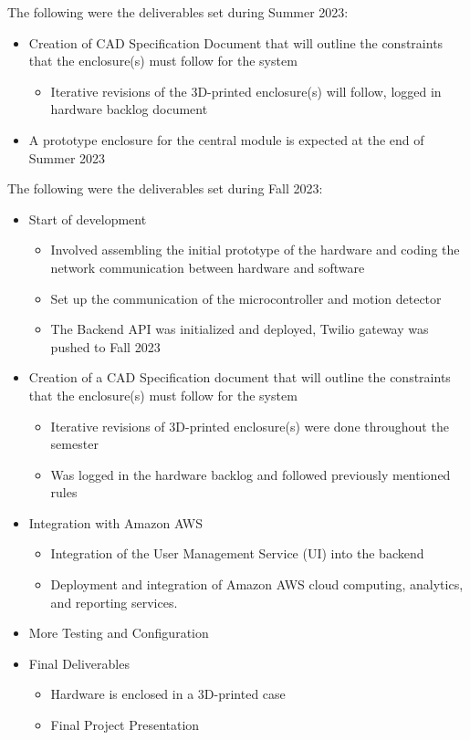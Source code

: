 \documentclass[conference]{IEEEtran}
\begin{document}
The following were the deliverables set during Summer 2023:
\begin{itemize}
      \item Creation of CAD Specification Document that will outline the
            constraints that the enclosure(s) must follow for the system
            \begin{itemize}
                  \item Iterative revisions of the 3D-printed enclosure(s) will follow, logged in hardware backlog document
            \end{itemize}
      \item A prototype enclosure for the central module is expected at the end of Summer 2023
\end{itemize}

The following were the deliverables set during Fall 2023:
\begin{itemize}
      \item Start of development
            \begin{itemize}
                  \item Involved assembling the initial prototype of the hardware and coding
                        the network communication between hardware and software
                  \item Set up the communication of the microcontroller and motion detector
                  \item The Backend API was initialized and deployed, Twilio gateway was pushed to Fall 2023
            \end{itemize}
      \item Creation of a CAD Specification document that will outline the constraints
            that the enclosure(s) must follow for the system
            \begin{itemize}
                  \item Iterative revisions of 3D-printed enclosure(s) were done throughout the
                        semester
                  \item Was logged in the hardware backlog and followed previously mentioned rules
            \end{itemize}
      \item Integration with Amazon AWS
            \begin{itemize}
                  \item Integration of the User Management Service (UI) into the backend
                  \item Deployment and integration of Amazon AWS cloud computing,
                        analytics, and reporting services.
            \end{itemize}
      \item More Testing and Configuration
      \item Final Deliverables
            \begin{itemize}
                  \item Hardware is enclosed in a 3D-printed case
                  \item Final Project Presentation
            \end{itemize}
\end{itemize}
\end{document}
